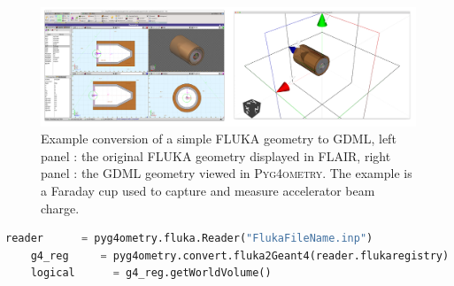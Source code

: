 \documentclass[final,5p,times,twocolumn]{elsarticle}
\newcommand{\PYGEOMETRY}{\textsc{Pyg4ometry}}
\begin{document}
\begin{figure}[htbp]
\begin{center}
\includegraphics[width=1.0\textwidth]{./model-scene/faradayCup2.pdf}
\caption{Example conversion of a simple FLUKA geometry to GDML, left panel :
the original FLUKA geometry displayed in FLAIR, right panel : the GDML geometry
viewed in \PYGEOMETRY{}. The example is a Faraday cup used to capture
and measure accelerator beam charge.}
\label{fig:fluka-to-geant4-cup}
\end{center}
\end{figure}

\begin{lstlisting}[caption={A simple \PYGEOMETRY{} Python script to load a FLUKA file.},label={lst:pythonFlukaLoading}, language=Python]
    reader      = pyg4ometry.fluka.Reader("FlukaFileName.inp")
    g4_reg     = pyg4ometry.convert.fluka2Geant4(reader.flukaregistry)
    logical      = g4_reg.getWorldVolume()
\end{lstlisting}
\end{document}
